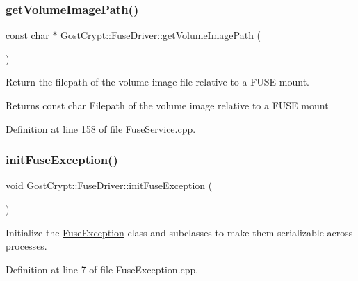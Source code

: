 \subsubsection{\texorpdfstring{get\+Volume\+Image\+Path()}{getVolumeImagePath()}}
{\footnotesize\ttfamily const char $\ast$ Gost\+Crypt\+::\+Fuse\+Driver\+::get\+Volume\+Image\+Path (\begin{DoxyParamCaption}{ }\end{DoxyParamCaption})}



Return the filepath of the volume image file relative to a F\+U\+SE mount. 

\begin{DoxyReturn}{Returns}
const char Filepath of the volume image relative to a F\+U\+SE mount 
\end{DoxyReturn}


Definition at line 158 of file Fuse\+Service.\+cpp.

\mbox{\label{namespace_gost_crypt_1_1_fuse_driver_a10c2b3982f529be695130f2e8277234e}} 
\subsubsection{\texorpdfstring{init\+Fuse\+Exception()}{initFuseException()}}
{\footnotesize\ttfamily void Gost\+Crypt\+::\+Fuse\+Driver\+::init\+Fuse\+Exception (\begin{DoxyParamCaption}{ }\end{DoxyParamCaption})}



Initialize the \hyperlink{class_gost_crypt_1_1_fuse_driver_1_1_fuse_exception}{Fuse\+Exception} class and subclasses to make them serializable across processes. 



Definition at line 7 of file Fuse\+Exception.\+cpp.

\mbox{\label{namespace_gost_crypt_1_1_fuse_driver_a8447fdc700c294915a56b6b9acf08b56}} 
